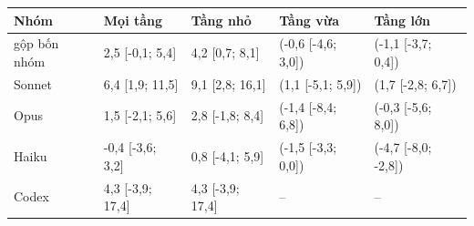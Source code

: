 \begin{tabular}{lllll}
\toprule
Nhóm & Mọi tầng & Tầng nhỏ & Tầng vừa & Tầng lớn \\
\midrule
gộp bốn nhóm & 2,5 [-0,1; 5,4] & 4,2 [0,7; 8,1] & (-0,6 [-4,6; 3,0]) & (-1,1 [-3,7; 0,4]) \\
Sonnet & 6,4 [1,9; 11,5] & 9,1 [2,8; 16,1] & (1,1 [-5,1; 5,9]) & (1,7 [-2,8; 6,7]) \\
Opus & 1,5 [-2,1; 5,6] & 2,8 [-1,8; 8,4] & (-1,4 [-8,4; 6,8]) & (-0,3 [-5,6; 8,0]) \\
Haiku & -0,4 [-3,6; 3,2] & 0,8 [-4,1; 5,9] & (-1,5 [-3,3; 0,0]) & (-4,7 [-8,0; -2,8]) \\
Codex & 4,3 [-3,9; 17,4] & 4,3 [-3,9; 17,4] & -- & -- \\
\bottomrule
\end{tabular}
